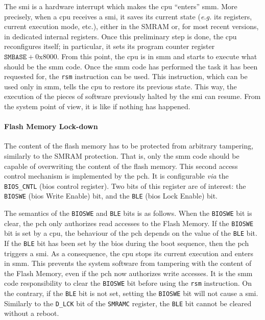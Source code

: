 The \ac{smi} is a hardware interrupt which makes the \ac{cpu} ``enters''
\ac{smm}.
%
More precisely, when a \ac{cpu} receives a \ac{smi}, it saves its current state
(\emph{e.g.} its registers, current execution mode, etc.), either in the SMRAM
or, for most recent versions, in dedicated internal registers.
%
Once this preliminary step is done, the \ac{cpu} reconfigures itself;
%
in particular, it sets its program counter register
$\mathtt{SMBASE} + \mathrm{0x8000}$.
%
From this point, the \ac{cpu} is in \ac{smm} and starts to execute what should
be the \ac{smm} code.
%
Once the \ac{smm} code has performed the task it has been requested for, the
\texttt{rsm} instruction can be used.
%
This instruction, which can be used only in \ac{smm}, tells the \ac{cpu} to
restore its previous state.
%
This way, the execution of the pieces of software previously halted by the
\ac{smi} can resume.
%
From the system point of view, it is like if nothing has happened.

\paragraph{Flash Memory Lock-down}
%
The content of the flash memory has to be protected from arbitrary tampering,
similarly to the SMRAM protection.
%
That is, only the \ac{smm} code should be capable of overwriting the content of
the flash memory.
%
This second access control mechanism is implemented by the \ac{pch}.
%
It is configurable \emph{via} the \texttt{BIOS\_CNTL} (\ac{bios} control
register).
%
Two bits of this register are of interest: the \texttt{BIOSWE} (\ac{bios} Write
Enable) bit, and the \texttt{BLE} (\ac{bios} Lock Enable) bit.

The semantics of the \texttt{BIOSWE} and \texttt{BLE} bits is as follows.
%
When the \texttt{BIOSWE} bit is clear, the \ac{pch} only authorizes read accesses to
the Flash Memory.
%
If the \texttt{BIOSWE} bit is set by a \ac{cpu}, the behaviour of the \ac{pch}
depends on the value of the \texttt{BLE} bit.
%
If the \texttt{BLE} bit has been set by the \ac{bios} during the boot sequence,
then the \ac{pch} triggers a \ac{smi}.
%
As a consequence, the \ac{cpu} stops its current execution and enters in
\ac{smm}.
%
This prevents the system software from tampering with the content of the Flash
Memory, even if the \ac{pch} now authorizes write accesses.
%
It is the \ac{smm} code responsibility to clear the \texttt{BIOSWE} bit before
using the \texttt{rsm} instruction.
%
On the contrary, if the \texttt{BLE} bit is not set, setting the \texttt{BIOSWE}
bit will not cause a \ac{smi}.
%
Similarly to the \texttt{D\_LCK} bit of the \texttt{SMRAMC} register, the
\texttt{BLE} bit cannot be cleared without a reboot.

